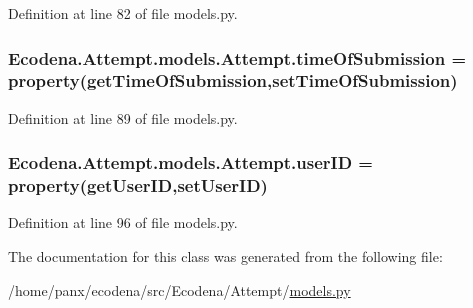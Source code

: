 Definition at line 82 of file models.py.

\hypertarget{class_ecodena_1_1_attempt_1_1models_1_1_attempt_a7ca881b180c5ce4d8e3169d0836422b7}{
\subsubsection[{timeOfSubmission}]{\setlength{\rightskip}{0pt plus 5cm}Ecodena.Attempt.models.Attempt.timeOfSubmission = property(getTimeOfSubmission,setTimeOfSubmission)}}
\label{d5/da0/class_ecodena_1_1_attempt_1_1models_1_1_attempt_a7ca881b180c5ce4d8e3169d0836422b7}


Definition at line 89 of file models.py.

\hypertarget{class_ecodena_1_1_attempt_1_1models_1_1_attempt_a30b68dbbff514c8422ba89a5e65e0e7d}{
\subsubsection[{userID}]{\setlength{\rightskip}{0pt plus 5cm}Ecodena.Attempt.models.Attempt.userID = property(getUserID,setUserID)}}
\label{d5/da0/class_ecodena_1_1_attempt_1_1models_1_1_attempt_a30b68dbbff514c8422ba89a5e65e0e7d}


Definition at line 96 of file models.py.



The documentation for this class was generated from the following file:\begin{DoxyCompactItemize}
\item 
/home/panx/ecodena/src/Ecodena/Attempt/\hyperlink{_attempt_2models_8py}{models.py}\end{DoxyCompactItemize}
